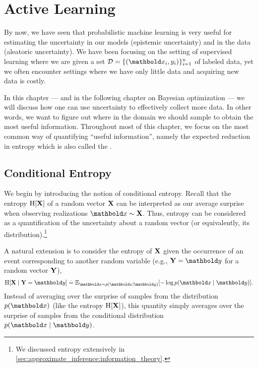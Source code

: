 \chapter{Active Learning}\label{sec:active_learning}

By now, we have seen that probabilistic machine learning is very useful for estimating the uncertainty in our models (epistemic uncertainty) and in the data (aleatoric uncertainty).
We have been focusing on the setting of supervised learning where we are given a set $\spD = \{(\vx_i, y_i)\}_{i=1}^n$ of labeled data, yet we often encounter settings where we have only little data and acquiring new data is costly.

In this chapter --- and in the following chapter on Bayesian optimization --- we will discuss how one can use uncertainty to effectively collect more data.
In other words, we want to figure out where in the domain we should sample to obtain the most useful information.
Throughout most of this chapter, we focus on the most common way of quantifying ``useful information'', namely the expected reduction in entropy which is also called the .

\section{Conditional Entropy}

We begin by introducing the notion of conditional entropy.
Recall that the entropy $\H{\rX}$ of a random vector $\mathbf{X}$ can be interpreted as our average surprise when observing realizations $\vx \sim \rX$.
Thus, entropy can be considered as a quantification of the uncertainty about a random vector (or equivalently, its distribution).\footnote{We discussed entropy extensively in \cref{sec:approximate_inference:information_theory}.}

A natural extension is to consider the entropy of $\mathbf{X}$ given the occurrence of an event corresponding to another random variable (e.g., $\rY = \vy$ for a random vector $\mathbf{Y}$), \begin{align}
  \H{\rX \mid \rY = \vy} \defeq \E[\vx \sim p(\vx \mid \vy)]{- \log p(\vx \mid \vy)}.
\end{align}
Instead of averaging over the surprise of samples from the distribution~$p(\vx)$ (like the entropy $\H{\rX}$), this quantity simply averages over the surprise of samples from the conditional distribution $p(\vx \mid \vy)$.

